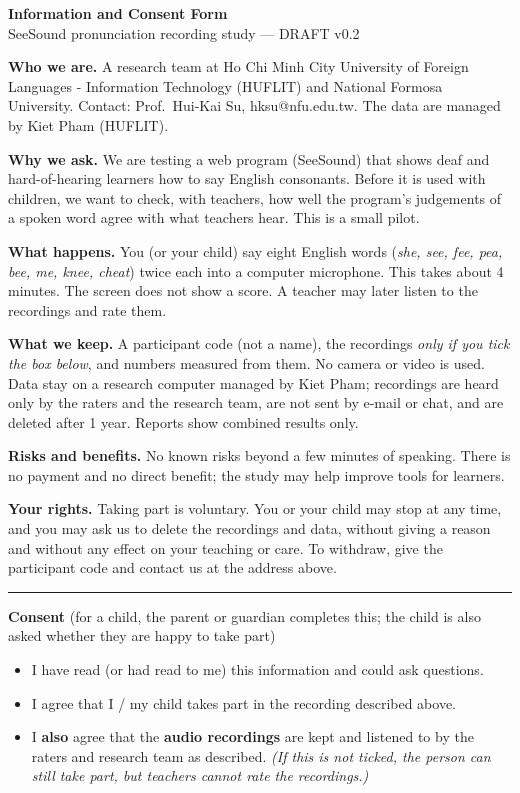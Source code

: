 \documentclass[11pt,a4paper]{article}
\begin{document}
\begin{center}{\Large\bfseries Information and Consent Form}\\[2pt]
SeeSound pronunciation recording study --- DRAFT v0.2\end{center}

\textbf{Who we are.} A research team at Ho Chi Minh City University of Foreign Languages - Information Technology (HUFLIT) and National Formosa University. Contact: Prof.\ Hui-Kai Su, hksu@nfu.edu.tw. The data are managed by Kiet Pham (HUFLIT).

\textbf{Why we ask.} We are testing a web program (SeeSound) that shows deaf and hard-of-hearing learners how to say English consonants. Before it is used with children, we want to check, with teachers, how well the program's judgements of a spoken word agree with what teachers hear. This is a small pilot.

\textbf{What happens.} You (or your child) say eight English words (\textit{she, see, fee, pea, bee, me, knee, cheat}) twice each into a computer microphone. This takes about 4 minutes. The screen does not show a score. A teacher may later listen to the recordings and rate them.

\textbf{What we keep.} A participant code (not a name), the recordings \emph{only if you tick the box below}, and numbers measured from them. No camera or video is used. Data stay on a research computer managed by Kiet Pham; recordings are heard only by the raters and the research team, are not sent by e-mail or chat, and are deleted after 1 year. Reports show combined results only.

\textbf{Risks and benefits.} No known risks beyond a few minutes of speaking. There is no payment and no direct benefit; the study may help improve tools for learners.

\textbf{Your rights.} Taking part is voluntary. You or your child may stop at any time, and you may ask us to delete the recordings and data, without giving a reason and without any effect on your teaching or care. To withdraw, give the participant code and contact us at the address above.

\medskip\hrule\medskip
\textbf{Consent} (for a child, the parent or guardian completes this; the child is also asked whether they are happy to take part)

\begin{itemize}[label=$\square$]
\item I have read (or had read to me) this information and could ask questions.
\item I agree that I / my child takes part in the recording described above.
\item I \textbf{also} agree that the \textbf{audio recordings} are kept and listened to by the raters and research team as described. \textit{(If this is not ticked, the person can still take part, but teachers cannot rate the recordings.)}
\end{itemize}
\end{document}
